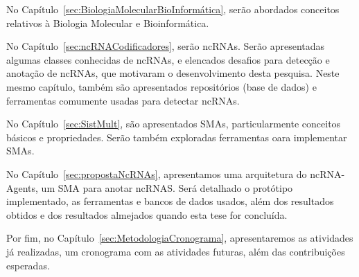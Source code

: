 No Capítulo~\ref{sec:BiologiaMolecularBioInformática}, serão abordados conceitos relativos à Biologia Molecular e Bioinformática.

No Capítulo~\ref{sec:ncRNACodificadores}, serão ncRNAs. Serão apresentadas algumas classes conhecidas de ncRNAs, e elencados desafios para detecção e anotação de ncRNAs, que motivaram o desenvolvimento desta pesquisa. Neste mesmo capítulo, também são apresentados repositórios (base de dados) e ferramentas comumente usadas para detectar ncRNAs.

No Capítulo~\ref{sec:SistMult}, são apresentados SMAs, particularmente conceitos básicos e propriedades. Serão também exploradas ferramentas oara implementar SMAs.

No Capítulo~\ref{sec:propostaNcRNAs}, apresentamos uma arquitetura do ncRNA-Agents, um SMA para anotar ncRNAS. Será detalhado o protótipo implementado, as ferramentas e bancos de dados usados, além dos resultados obtidos e dos resultados almejados quando esta tese for concluída.

Por fim, no Capítulo~\ref{sec:MetodologiaCronograma}, apresentaremos as atividades já realizadas, um cronograma com as atividades futuras, além das contribuições esperadas.